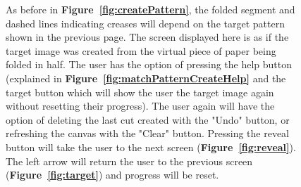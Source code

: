 \documentclass[11pt]{article}
\begin{document}
           \begin{figure}
                \begin{minipage}[c]{0.65\textwidth}
                \caption{As before in \textbf{Figure~\ref{fig:createPattern}}, the folded segment and dashed lines indicating creases will depend on the target pattern shown in the previous page. The screen displayed here is as if the target image was created from the virtual piece of paper being folded in half. The user has the option of pressing the help button (explained in \textbf{Figure~\ref{fig:matchPatternCreateHelp}} and the target button which will show the user the target image again without resetting their progress). The user again will have the option of deleting the last cut created with the "Undo" button, or refreshing the canvas with the "Clear" button. Pressing the reveal button will take the user to the next screen (\textbf{Figure~\ref{fig:reveal}}). 
                The left arrow will return the user to the previous screen (\textbf{Figure~\ref{fig:target}}) and progress will be reset.}
                \label{fig:matchPatternCreate}
                \end{minipage}\hfill
                \begin{minipage}[c]{0.35\textwidth}

\end{minipage}
\end{figure}
\end{document}

